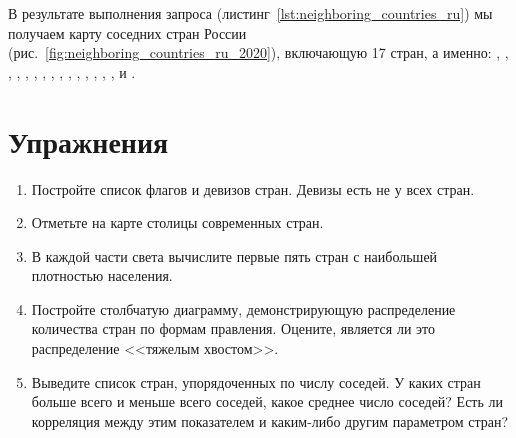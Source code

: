 В результате выполнения запроса (листинг~\ref{lst:neighboring_countries_ru}) мы получаем карту соседних стран России (рис.~\ref{fig:neighboring_countries_ru_2020}), включающую 17 стран, а именно: , , , , , , , , , , , , , , ,  и .


\begin{figure*}[h]
	{
		\setlength{\fboxsep}{0pt}%
		\setlength{\fboxrule}{1pt}%
	}
	\caption{Карта соседних стран России, включающая 17 стран, 2021.
	}%
	\label{fig:neighboring_countries_ru_2020}%
\end{figure*}


\section{Упражнения}

\begin{enumerate}
	\item Постройте список флагов и девизов стран. Девизы есть не у всех стран.
	\item Отметьте на карте столицы современных стран.
	\item В каждой части света вычислите первые пять стран с наибольшей плотностью населения.
	\item Постройте столбчатую диаграмму, демонстрирующую распределение количества стран по формам правления. Оцените, является ли это распределение <<тяжелым хвостом>>\protect\footnotemark.
	\item Выведите список стран, упорядоченных по числу соседей. У каких стран больше всего и меньше всего соседей, какое среднее число соседей? Есть ли корреляция между этим показателем и каким-либо другим параметром стран?
\end{enumerate}


